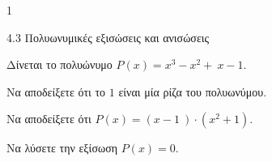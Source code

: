 \begin{ylh}{1}
\item 4.3 Πολυωνυμικές εξισώσεις και ανισώσεις
\end{ylh}
Δίνεται το πολυώνυμο $P(x) = x^{3} - x^{2} + \ x - 1$.
\begin{alist}
\item Να αποδείξετε ότι το $1$ είναι μία ρίζα του πολυωνύμου.
\item Να αποδείξετε ότι $P(x) = (x - 1\ ) \cdot (x^{2} + 1)$.
\item Να λύσετε την εξίσωση $P(x) = 0$.
\end{alist}

